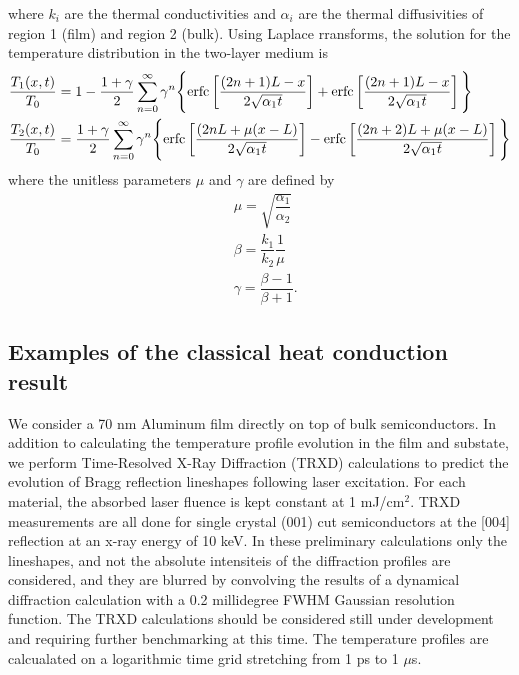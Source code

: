 \documentclass[letterpaper,11pt]{article}
\begin{document}
where $k_i$ are the thermal conductivities and $\alpha_i$ are the thermal diffusivities of region 1 (film) and region 2 (bulk).  
Using Laplace rransforms, the solution for the temperature distribution in the two-layer medium is
\begin{subequations}
\begin{align}
& \dfrac{T_1(x,t)}{T_0}=1-\dfrac{1+\gamma}{2}\sum\limits_{n=0}^\infty \gamma^n \Bigg\{ \textnormal{erfc} \left[ \dfrac{(2n+1)L-x}{2\sqrt{\alpha_1 t}} \right] + \textnormal{erfc} \left[ \dfrac{(2n+1)L-x}{2\sqrt{\alpha_1 t}} \right] \Bigg\}  \\
& \dfrac{T_2(x,t)}{T_0}=\dfrac{1+\gamma}{2}\sum\limits_{n=0}^\infty \gamma^n \Bigg\{ \textnormal{erfc} \left[ \dfrac{(2nL+\mu(x-L)}{2\sqrt{\alpha_1 t}} \right] - \textnormal{erfc} \left[ \dfrac{(2n+2)L+\mu(x-L)}{2\sqrt{\alpha_1 t}} \right] \Bigg\} 
\end{align}
\end{subequations}
where the unitless parameters $\mu$ and $\gamma$ are defined by
\begin{subequations}
\begin{align}
& \mu = \sqrt{\dfrac{\alpha_1}{\alpha_2}} \\
& \beta = \dfrac{k_1}{k_2} \dfrac{1}{\mu} \\
& \gamma = \dfrac{\beta -1}{\beta+1} .
\end{align}
\end{subequations}

\subsection{Examples of the classical heat conduction result}
We consider a 70 nm Aluminum film directly on top of bulk semiconductors.  In addition to calculating the temperature profile evolution in the film and substate, we perform Time-Resolved X-Ray Diffraction (TRXD) calculations to predict the evolution of Bragg reflection lineshapes following laser excitation.  For each material, the absorbed laser fluence is kept constant at 1 mJ/cm$^2$.  TRXD measurements are all done for single crystal (001) cut semiconductors at the [004] reflection at an x-ray energy of 10 keV.  In these preliminary calculations only the lineshapes, and not the absolute intensiteis of the diffraction profiles are considered, and they are blurred by convolving the results of a dynamical diffraction calculation with a 0.2 millidegree FWHM Gaussian resolution function.  The TRXD calculations should be considered still under development and requiring further benchmarking at this time.  The temperature profiles are calcualated on a logarithmic time grid stretching from 1 ps to 1 $\mu$s.  
\newpage
\end{document}
